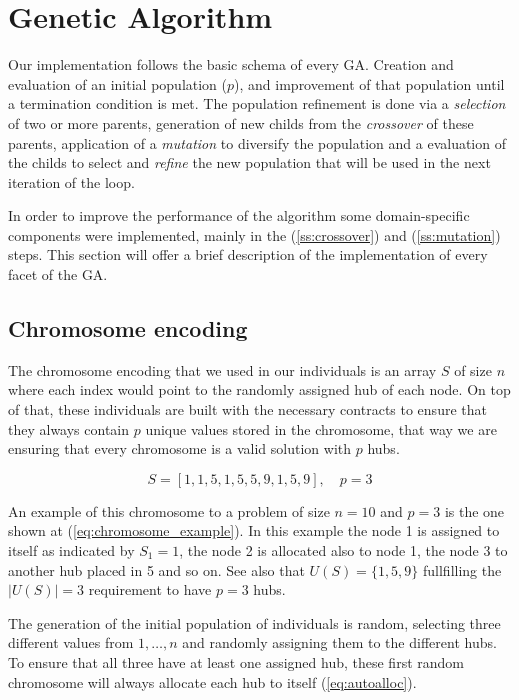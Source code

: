 \section{Genetic Algorithm}

Our implementation follows the basic schema of every GA\cite{Thede2004}. Creation and evaluation of an initial
population ($p$), and improvement of that population until a termination condition is met. The population
refinement  is done via a \emph{selection} of two or more parents, generation of new childs from the
\emph{crossover} of these parents, application of a \emph{mutation} to diversify the population and a
evaluation of the childs to select and \emph{refine} the new population that will be used in the next
iteration of the loop.

In order to improve the performance of the algorithm some domain-specific components were implemented,
mainly in the  (\ref{ss:crossover}) and  (\ref{ss:mutation})
steps. This section will offer a brief description of the implementation of every facet of the GA.

\subsection{Chromosome encoding\label{ss:chromosome}}

The chromosome encoding that we used in our individuals is an array $S$ of size $n$ where each index would
point to the randomly assigned hub of each node. On top of that, these individuals are built with the
necessary contracts to ensure that they always contain $p$ unique values stored in the chromosome, that
way we are ensuring that every chromosome is a valid solution with $p$ hubs.

\begin{equation}
  S = [1, 1, 5, 1, 5, 5, 9, 1, 5, 9 ],\quad p = 3 \label{eq:chromosome_example}
\end{equation}

An example of this chromosome to a problem of size $n = 10$ and $p = 3$ is the one shown at (\ref{eq:chromosome_example}).
In this example the node 1 is assigned to itself as indicated by $S_{1}=1$, the node 2 is allocated also
to node 1, the node 3 to another hub placed in 5 and so on. See also that $U(S)=\{1,5,9\}$ fullfilling
the $|U(S)|=3$ requirement to have $p=3$ hubs.

The generation of the initial population of individuals is random, selecting three different values from
${1,\dots,n}$ and randomly assigning them to the different hubs. To ensure that all three have at least
one assigned hub, these first random chromosome will always allocate each hub to itself (\ref{eq:autoalloc}).

